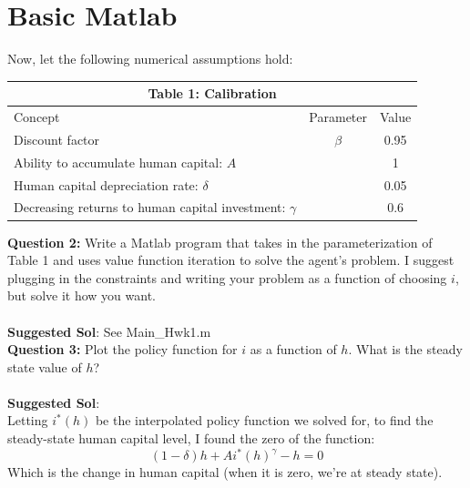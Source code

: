 \documentclass[11pt]{article}
\begin{document}
\section{Basic Matlab}
Now, let the following numerical assumptions hold:
\begin{table}[ht!]
\centering
\begin{tabular}{lcc}
\hline
\hline
\multicolumn{3}{c}{Table 1: Calibration}\\
\hline
Concept & Parameter & Value \\ 
Discount factor & $\beta$ & 0.95\\
Ability to accumulate human capital: $A$ &  & 1\\
Human capital depreciation rate: $\delta$ &  & 0.05\\
Decreasing returns to human capital investment: $\gamma$ &  & 0.6\\
\hline
\hline
\end{tabular}
\end{table}

\textbf{Question 2:} Write a Matlab program that takes in the parameterization of Table 1 and uses value function iteration to solve the agent's problem.  I suggest plugging in the constraints and writing your problem as a function of choosing $i$, but solve it how you want.\\
\ \\
\textbf{Suggested Sol}: See Main\_Hwk1.m \\

\textbf{Question 3:} Plot the policy function for $i$ as a function of $h$.  What is the steady state value of $h$?\\
\ \\
\textbf{Suggested Sol}: \\
Letting $i^*(h)$ be the interpolated policy function we solved for, to find the steady-state human capital level, I found the zero of the function:
$$(1-\delta)h+Ai^*(h)^\gamma-h=0$$
Which is the change in human capital (when it is zero, we're at steady state).
\end{document}
